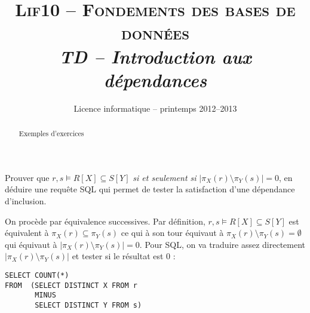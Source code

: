 \documentclass[11pt,a4paper]{article} %
\title{\textsc{Lif{10} -- Fondements des bases de données}\\
        \emph{TD -- Introduction aux dépendances}}
\author{Licence informatique -- printemps 2012--2013}
\date{}%
\newcommand{\di}{\subseteq}
\begin{document}
  \maketitle
  \thispagestyle{empty}


	\begin{abstract}
	Exemples d'exercices \LaTeXe
	\end{abstract} 



\begin{Exercise}[title={vérification des dépendances en SQL}, label={TD2.3}]

Prouver que $r,s \models R[X] \di S[Y]$ \emph{si et seulement si} $|\pi_X(r) \setminus \pi_{Y}(s)|=0$, en déduire  une requête SQL qui permet de tester la satisfaction d'une dépendance d'inclusion.

\end{Exercise}

\begin{Answer}[ref={TD2.3}]

On procède par équivalence successives. Par définition, $r,s \models R[X] \di S[Y]$ est équivalent à $\pi_X(r) \di \pi_Y(s)$ ce qui à son tour équivaut à $\pi_X(r) \setminus \pi_Y(s) = \emptyset$ qui équivaut à $|\pi_X(r) \setminus \pi_{Y}(s)|=0$. Pour SQL, on va traduire assez directement $|\pi_X(r) \setminus \pi_{Y}(s)|$ et tester si le résultat est $0$ :
\begin{lstlisting}
SELECT COUNT(*)
FROM  (SELECT DISTINCT X FROM r
       MINUS
       SELECT DISTINCT Y FROM s)

\end{lstlisting}
\end{Answer}
\end{document}
